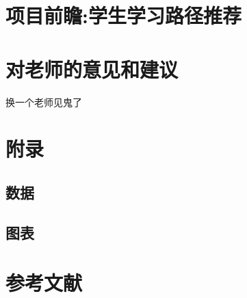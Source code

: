 \documentclass[UTF8]{ctexart}
\begin{document}
\section{项目前瞻:学生学习路径推荐}
\section{对老师的意见和建议}
换一个老师见鬼了
\section{附录}
\subsection{数据}
\subsection{图表}
\section{参考文献}
\end{document}
